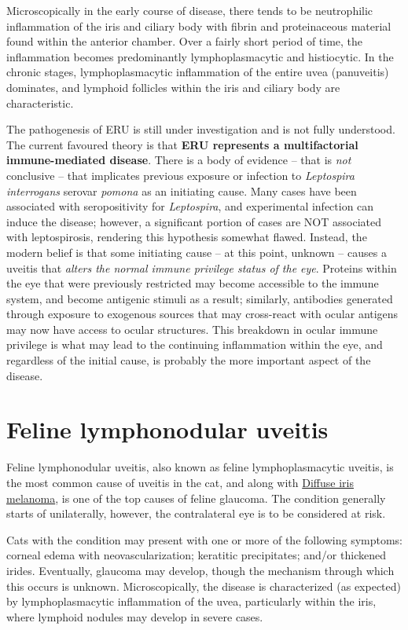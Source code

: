 \documentclass[openany]{book}
\begin{document}
Microscopically in the early course of disease, there tends to be
neutrophilic inflammation of the iris and ciliary body with fibrin and
proteinaceous material found within the anterior chamber. Over a fairly
short period of time, the inflammation becomes predominantly
lymphoplasmacytic and histiocytic. In the chronic stages,
lymphoplasmacytic inflammation of the entire uvea (panuveitis)
dominates, and lymphoid follicles within the iris and ciliary body are
characteristic.

The pathogenesis of ERU is still under investigation and is not fully
understood. The current favoured theory is that \textbf{ERU represents a
multifactorial immune-mediated disease}. There is a body of evidence --
that is \emph{not} conclusive -- that implicates previous exposure or
infection to \emph{Leptospira interrogans} serovar \emph{pomona} as an
initiating cause. Many cases have been associated with seropositivity
for \emph{Leptospira}, and experimental infection can induce the
disease; however, a significant portion of cases are NOT associated with
leptospirosis, rendering this hypothesis somewhat flawed. Instead, the
modern belief is that some initiating cause -- at this point, unknown --
causes a uveitis that \emph{alters the normal immune privilege status of
the eye}. Proteins within the eye that were previously restricted may
become accessible to the immune system, and become antigenic stimuli as
a result; similarly, antibodies generated through exposure to exogenous
sources that may cross-react with ocular antigens may now have access to
ocular structures. This breakdown in ocular immune privilege is what may
lead to the continuing inflammation within the eye, and regardless of
the initial cause, is probably the more important aspect of the disease.

\hypertarget{feline-lymphonodular-uveitis}{\section{Feline lymphonodular
uveitis}\label{feline-lymphonodular-uveitis}}

Feline lymphonodular uveitis, also known as feline lymphoplasmacytic
uveitis, is the most common cause of uveitis in the cat, and along with
\protect\hyperlink{diffuse-iris-melanoma}{Diffuse iris melanoma}, is one
of the top causes of feline glaucoma. The condition generally starts of
unilaterally, however, the contralateral eye is to be considered at
risk.

Cats with the condition may present with one or more of the following
symptoms: corneal edema with neovascularization; keratitic precipitates;
and/or thickened irides. Eventually, glaucoma may develop, though the
mechanism through which this occurs is unknown. Microscopically, the
disease is characterized (as expected) by lymphoplasmacytic inflammation
of the uvea, particularly within the iris, where lymphoid nodules may
develop in severe cases.
\end{document}
